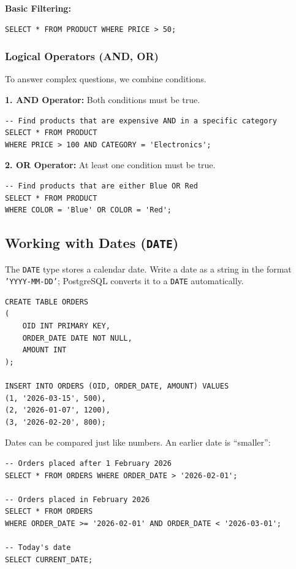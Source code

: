 \documentclass[12pt,a4paper]{article}
\begin{document}
\textbf{Basic Filtering:}
\begin{lstlisting}
SELECT * FROM PRODUCT WHERE PRICE > 50;
\end{lstlisting}

\subsubsection{Logical Operators (AND, OR)}
To answer complex questions, we combine conditions.

\textbf{1. AND Operator:}
Both conditions must be true.
\begin{lstlisting}
-- Find products that are expensive AND in a specific category
SELECT * FROM PRODUCT 
WHERE PRICE > 100 AND CATEGORY = 'Electronics';
\end{lstlisting}

\textbf{2. OR Operator:}
At least one condition must be true.
\begin{lstlisting}
-- Find products that are either Blue OR Red
SELECT * FROM PRODUCT 
WHERE COLOR = 'Blue' OR COLOR = 'Red';
\end{lstlisting}

\subsection{Working with Dates (\texttt{DATE})}
The \texttt{DATE} type stores a calendar date. Write a date as a string in the format \texttt{'YYYY-MM-DD'}; PostgreSQL converts it to a \texttt{DATE} automatically.

\begin{lstlisting}
CREATE TABLE ORDERS
(
    OID INT PRIMARY KEY,
    ORDER_DATE DATE NOT NULL,
    AMOUNT INT
);

INSERT INTO ORDERS (OID, ORDER_DATE, AMOUNT) VALUES
(1, '2026-03-15', 500),
(2, '2026-01-07', 1200),
(3, '2026-02-20', 800);
\end{lstlisting}

Dates can be compared just like numbers. An earlier date is ``smaller'':
\begin{lstlisting}
-- Orders placed after 1 February 2026
SELECT * FROM ORDERS WHERE ORDER_DATE > '2026-02-01';

-- Orders placed in February 2026
SELECT * FROM ORDERS
WHERE ORDER_DATE >= '2026-02-01' AND ORDER_DATE < '2026-03-01';

-- Today's date
SELECT CURRENT_DATE;
\end{lstlisting}
\end{document}
